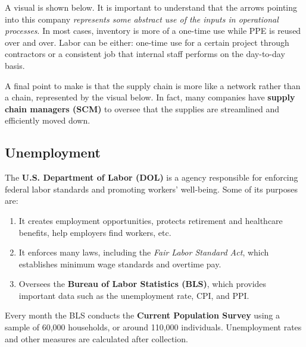\documentclass{article}
\begin{document}
    A visual is shown below. It is important to understand that the arrows pointing into this company \textit{represents some abstract use of the inputs in operational processes}. In most cases, inventory is more of a one-time use while PPE is reused over and over. Labor can be either: one-time use for a certain project through contractors or a consistent job that internal staff performs on the day-to-day basis.

    \begin{center}
    \end{center}

    A final point to make is that the supply chain is more like a network rather than a chain, represented by the visual below. In fact, many companies have \textbf{supply chain managers (SCM)} to oversee that the supplies are streamlined and efficiently moved down.

    \begin{center}
    \end{center}

  \subsection{Unemployment}

    \begin{definition}
      The \textbf{U.S. Department of Labor (DOL)} is a agency responsible for enforcing federal labor standards and promoting workers' well-being. Some of its purposes are: 
      \begin{enumerate}
          \item It creates employment opportunities, protects retirement and healthcare benefits, help employers find workers, etc. 
          \item It enforces many laws, including the \textit{Fair Labor Standard Act}, which establishes minimum wage standards and overtime pay. 
          \item Oversees the \textbf{Bureau of Labor Statistics (BLS)}, which provides important data such as the unemployment rate, CPI, and PPI. 
      \end{enumerate}
      Every month the BLS conducts the \textbf{Current Population Survey} using a sample of 60,000 households, or around 110,000 individuals. Unemployment rates and other measures are calculated after collection. 
    \end{definition}
\end{document}
